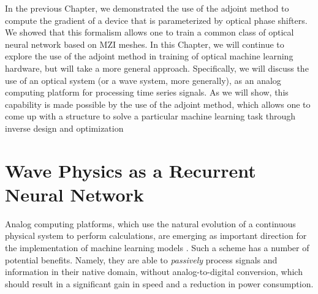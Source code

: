 In the previous Chapter, we demonstrated the use of the adjoint method to compute the gradient of a device that is parameterized by optical phase shifters.  We showed that this formalism allows one to train a common class of optical neural network based on MZI meshes.  In this Chapter, we will continue to explore the use of the adjoint method in training of optical machine learning hardware, but will take a more general approach.  Specifically, we will discuss the use of an optical system (or a wave system, more generally), as an analog computing platform for processing time series signals.  As we will show, this capability is made possible by the use of the adjoint method, which allows one to come up with a structure to solve a particular machine learning task through inverse design and optimization \cite{hughes_wave_2019}



\section{Wave Physics as a Recurrent Neural Network}

Analog computing platforms, which use the natural evolution of a continuous physical system to perform calculations, are emerging as important direction for the implementation of machine learning models \cite{shen2017deep, biamonte_quantum_2017, laporte2018numerical, lin2018all, Khoram_2019}.
Such a scheme has a number of potential benefits. Namely, they are able to \textit{passively} process signals and information in their native domain, without analog-to-digital conversion, which should result in a significant gain in speed and a reduction in power consumption.

